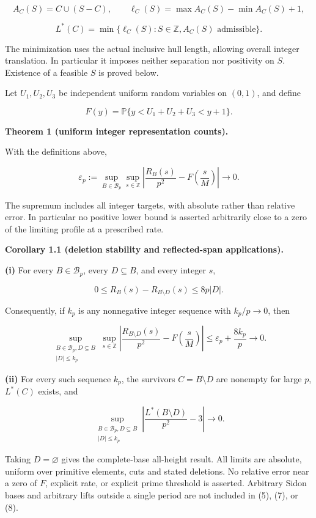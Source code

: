 \documentclass[11pt,a4paper]{article}
\begin{document}
\[A_C(S)=C\cup(S-C),\qquad
\ell_C(S)=\max A_C(S)-\min A_C(S)+1,\]

\[L^*(C)=\min\{\ell_C(S):S\in\mathbb Z, A_C(S)\text{ admissible}\}.
\tag{3}\]

The minimization uses the actual inclusive hull length, allowing overall integer translation. In particular it imposes neither separation nor positivity on \(S\). Existence of a feasible \(S\) is proved below.

Let \(U_1,U_2,U_3\) be independent uniform random variables on \((0,1)\), and define

\[F(y)=\mathbb P\{y<U_1+U_2+U_3<y+1\}.
\tag{4}\]

\textbf{Theorem 1 (uniform integer representation counts).}

With the definitions above,

\[\varepsilon_p:=\sup_{B\in\mathcal B_p}\sup_{s\in\mathbb Z}
\left|\frac{R_B(s)}{p^2}-F\!\left(\frac{s}{M}\right)\right|
\longrightarrow0.
\tag{5}\]

The supremum includes all integer targets, with absolute rather than relative error. In particular no positive lower bound is asserted arbitrarily close to a zero of the limiting profile at a prescribed rate.

\textbf{Corollary 1.1 (deletion stability and reflected-span applications).}

\textbf{(i)} For every \(B\in\mathcal B_p\), every \(D\subseteq B\), and every integer \(s\),

\[0\le R_B(s)-R_{B\setminus D}(s)\le8p|D|.
\tag{6}\]

Consequently, if \(k_p\) is any nonnegative integer sequence with \(k_p/p\to0\), then

\[\sup_{\substack{B\in\mathcal B_p, D\subseteq B\\|D|\le k_p}}
\sup_{s\in\mathbb Z}
\left|\frac{R_{B\setminus D}(s)}{p^2}-F\!\left(\frac{s}{M}\right)\right|
\le\varepsilon_p+\frac{8k_p}{p}\longrightarrow0.
\tag{7}\]

\textbf{(ii)} For every such sequence \(k_p\), the survivors \(C=B\setminus D\) are nonempty for large \(p\), \(L^*(C)\) exists, and

\[\sup_{\substack{B\in\mathcal B_p, D\subseteq B\\|D|\le k_p}}
\left|\frac{L^*(B\setminus D)}{p^2}-3\right|\longrightarrow0.
\tag{8}\]

Taking \(D=\varnothing\) gives the complete-base all-height result. All limits are absolute, uniform over primitive elements, cuts and stated deletions. No relative error near a zero of \(F\), explicit rate, or explicit prime threshold is asserted. Arbitrary Sidon bases and arbitrary lifts outside a single period are not included in (5), (7), or (8).
\end{document}
